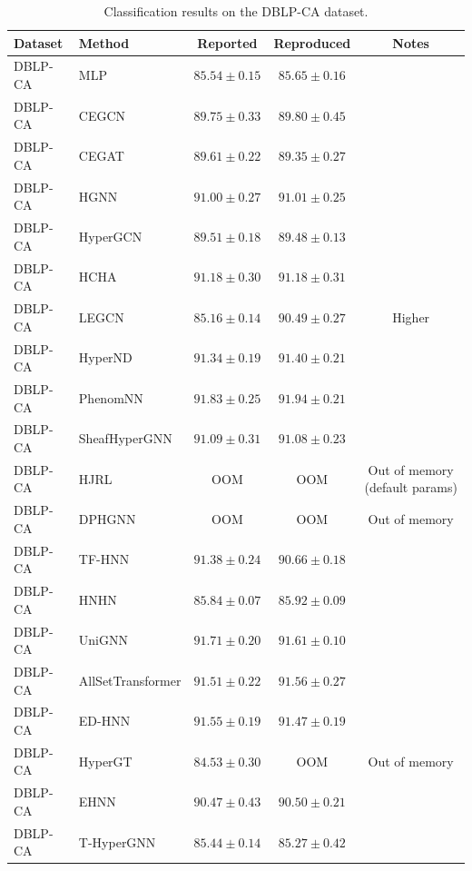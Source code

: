 \vspace{3em}

\begin{table}[H]
    \centering \small
    \renewcommand{\arraystretch}{1.12} 
    \begin{tabular}{llccc}
        \toprule
        Dataset & Method & Reported & Reproduced & Notes \\
        \midrule
        DBLP-CA & MLP & \(85.54 \pm 0.15\) & \(85.65 \pm 0.16\) & \\
        DBLP-CA & CEGCN & \(89.75 \pm 0.33\) & \(89.80 \pm 0.45\) & \\
        DBLP-CA & CEGAT & \(89.61 \pm 0.22\) & \(89.35 \pm 0.27\) & \\
        \grprule
        DBLP-CA & HGNN & \(91.00 \pm 0.27\) & \(91.01 \pm 0.25\) & \\
        DBLP-CA & HyperGCN & \(89.51 \pm 0.18\) & \(89.48 \pm 0.13\) & \\
        DBLP-CA & HCHA & \(91.18 \pm 0.30\) & \(91.18 \pm 0.31\) & \\
        DBLP-CA & LEGCN & \(85.16 \pm 0.14\) & \(90.49 \pm 0.27\) & Higher \\
        DBLP-CA & HyperND & \(91.34 \pm 0.19\) & \(91.40 \pm 0.21\) & \\
        DBLP-CA & PhenomNN & \(91.83 \pm 0.25\) & \(91.94 \pm 0.21\) & \\
        DBLP-CA & SheafHyperGNN & \(91.09 \pm 0.31\) & \(91.08 \pm 0.23\) & \\
        DBLP-CA & HJRL & OOM & OOM & Out of memory (default params) \\
        DBLP-CA & DPHGNN & OOM & OOM & Out of memory \\
        DBLP-CA & TF-HNN & \(91.38 \pm 0.24\) & \(90.66 \pm 0.18\) & \\
        \grprule
        DBLP-CA & HNHN & \(85.84 \pm 0.07\) & \(85.92 \pm 0.09\) & \\
        DBLP-CA & UniGNN & \(91.71 \pm 0.20\) & \(91.61 \pm 0.10\) & \\
        DBLP-CA & AllSetTransformer & \(91.51 \pm 0.22\) & \(91.56 \pm 0.27\) & \\
        DBLP-CA & ED-HNN & \(91.55 \pm 0.19\) & \(91.47 \pm 0.19\) & \\
        DBLP-CA & HyperGT & \(84.53 \pm 0.30\) & OOM & Out of memory \\
        \grprule
        DBLP-CA & EHNN & \(90.47 \pm 0.43\) & \(90.50 \pm 0.21\) & \\
        DBLP-CA & T-HyperGNN & \(85.44 \pm 0.14\) & \(85.27 \pm 0.42\) & \\
        \bottomrule
    \end{tabular}
    \caption{Classification results on the DBLP-CA dataset.}
\end{table}

